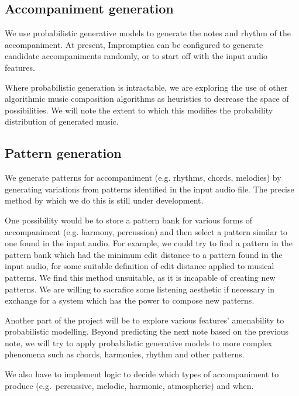 \documentclass[11pt,conference,letterpaper]{IEEEtran}
\begin{document}
\subsection{Accompaniment generation}

We use probabilistic generative models to generate the notes and rhythm of the accompaniment. At present, Impromptica can be configured to generate candidate accompaniments randomly, or to start off with the input audio features.

Where probabilistic generation is intractable, we are exploring the use of other algorithmic music composition algorithms as heuristics to decrease the space of possibilities. We will note the extent to which this modifies the probability distribution of generated music.


\subsection{Pattern generation}

We generate patterns for accompaniment (e.g. rhythms, chords, melodies) by generating variations from patterns identified in the input audio file. The precise method by which we do this is still under development.

One possibility would be to store a pattern bank for various forms of accompaniment (e.g. harmony, percussion) and then select a pattern similar to one found in the input audio. For example, we could try to find a pattern in the pattern bank which had the minimum edit distance to a pattern found in the input audio, for some suitable definition of edit distance applied to musical patterns. We find this method unsuitable, as it is incapable of creating new patterns. We are willing to sacrafice some listening aesthetic if necessary in exchange for a system which has the power to compose new patterns.

Another part of the project will be to explore various features’ amenability to probabilistic modelling. Beyond predicting the next note based on the previous note, we will try to apply probabilistic generative models to more complex phenomena such as chords, harmonies, rhythm and other patterns.

We also have to implement logic to decide which types of accompaniment to produce (e.g.\ percussive, melodic, harmonic, atmospheric) and when.
\end{document}
